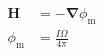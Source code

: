 \[
\begin{aligned}
\boldsymbol{H} &= -\boldsymbol{\nabla} \phi_{\mathrm{m}} \\
\phi_{\mathrm{m}} &= \frac{I \Omega}{4 \pi}
\end{aligned}
\]
